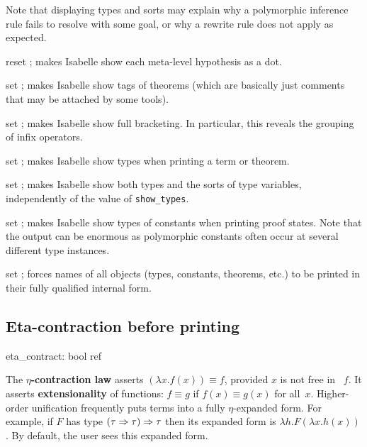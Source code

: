 Note that displaying types and sorts may explain why a polymorphic
inference rule fails to resolve with some goal, or why a rewrite rule
does not apply as expected.

\begin{ttdescription}

\item[reset \ttindexbold{show_hyps};] makes Isabelle show each
  meta-level hypothesis as a dot.
  
\item[set \ttindexbold{show_tags};] makes Isabelle show tags of theorems
  (which are basically just comments that may be attached by some tools).
  
\item[set \ttindexbold{show_brackets};] makes Isabelle show full
  bracketing.  In particular, this reveals the grouping of infix
  operators.
  
\item[set \ttindexbold{show_types};] makes Isabelle show types when
  printing a term or theorem.
  
\item[set \ttindexbold{show_sorts};] makes Isabelle show both types
  and the sorts of type variables, independently of the value of
  \texttt{show_types}.
  
\item[set \ttindexbold{show_consts};] makes Isabelle show types of constants
  when printing proof states.  Note that the output can be enormous as
  polymorphic constants often occur at several different type instances.

\item[set \ttindexbold{long_names};] forces names of all objects
  (types, constants, theorems, etc.) to be printed in their fully
  qualified internal form.

\end{ttdescription}


\subsection{Eta-contraction before printing}
\begin{ttbox} 
eta_contract: bool ref
\end{ttbox}
The {\bf $\eta$-contraction law} asserts $(\lambda x.f(x))\equiv f$,
provided $x$ is not free in ~$f$.  It asserts {\bf extensionality} of
functions: $f\equiv g$ if $f(x)\equiv g(x)$ for all~$x$.  Higher-order
unification frequently puts terms into a fully $\eta$-expanded form.  For
example, if $F$ has type $(\tau\Rightarrow\tau)\Rightarrow\tau$ then its expanded form is
$\lambda h.F(\lambda x.h(x))$.  By default, the user sees this expanded
form.

